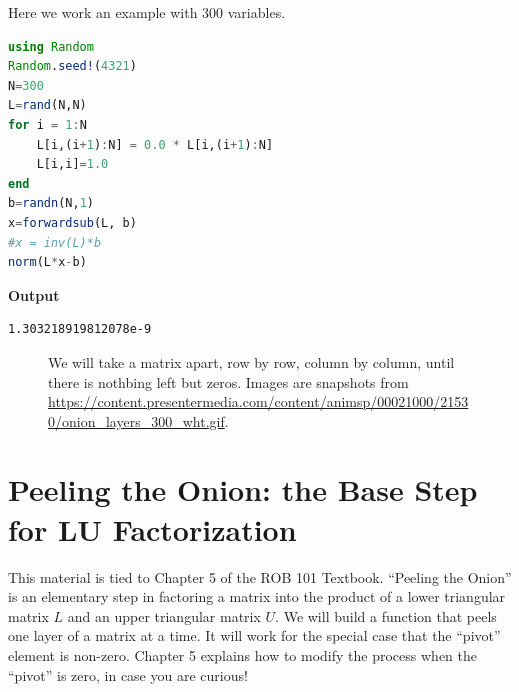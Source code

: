 Here we work an example with 300 variables. \\


\begin{lstlisting}[language=Julia,style=mystyle]
using Random
Random.seed!(4321)
N=300
L=rand(N,N)
for i = 1:N
    L[i,(i+1):N] = 0.0 * L[i,(i+1):N]
    L[i,i]=1.0
end
b=randn(N,1)
x=forwardsub(L, b)
#x = inv(L)*b
norm(L*x-b)
\end{lstlisting}
\textbf{Output} 
\begin{verbatim}
1.303218919812078e-9
\end{verbatim}


\begin{figure}[htb!]%
\centering
{}%
\hspace{5pt}%
%
\hspace{5pt}%
%


\caption[]{We will take a matrix apart, row by row, column by column, until there is nothbing left but zeros. Images are snapshots from \url{https://content.presentermedia.com/content/animsp/00021000/21530/onion_layers_300_wht.gif}.}
    \label{fig:Onion}
\end{figure}

\section{Peeling the Onion: the Base Step for LU Factorization}
\label{sec:PeelingOnions}

This material is tied to Chapter 5 of the ROB 101 Textbook. ``Peeling the Onion'' is an elementary step in factoring a matrix into the product of a lower triangular matrix $L$ and an upper triangular matrix $U$. We will build a function that peels one layer of a matrix at a time. It will work for the special case that the ``pivot'' element is non-zero. Chapter 5 explains how to modify the process when the ``pivot'' is zero, in case you are curious!\\

